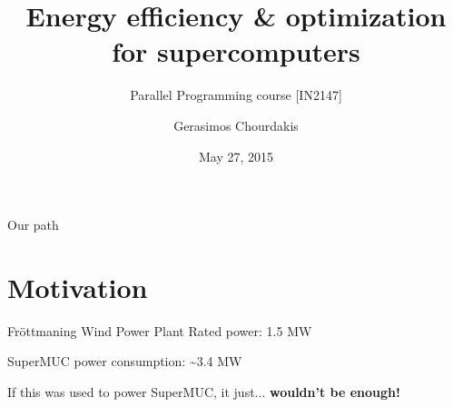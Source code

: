 \documentclass[10pt, compress]{beamer}
\title{Energy efficiency \& optimization for supercomputers}
\subtitle{Parallel Programming course [IN2147]}
\date{May 27, 2015}
\author{Gerasimos Chourdakis}
\institute{Technische Universität München - Supervisor: Prof. Dr. Michael Gerndt}
\begin{document}
\maketitle

\begin{frame}[fragile]{Our path}
    \tableofcontents
\end{frame}

\section{Motivation}



\begin{frame}[fragile]{Fröttmaning Wind Power Plant}
    Rated power: 1.5 MW
    
    \pause
    
    SuperMUC power consumption: \textasciitilde  3.4 MW
    
    \pause
    
    If this was used to power SuperMUC, it just... \textbf{wouldn't be enough!}
\end{frame}
\end{document}
